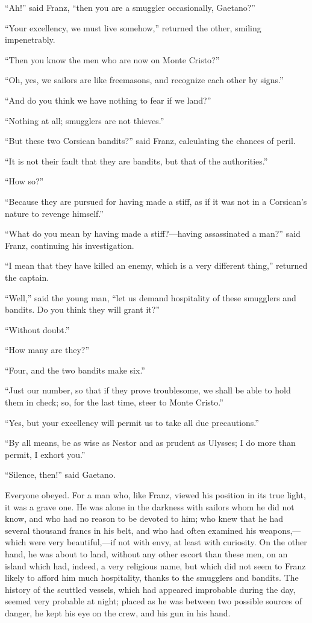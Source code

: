 “Ah!” said Franz, “then you are a smuggler occasionally, Gaetano?”

“Your excellency, we must live somehow,” returned the other, smiling
impenetrably.

“Then you know the men who are now on Monte Cristo?”

“Oh, yes, we sailors are like freemasons, and recognize each other by
signs.”

“And do you think we have nothing to fear if we land?”

“Nothing at all; smugglers are not thieves.”

“But these two Corsican bandits?” said Franz, calculating the chances
of peril.

“It is not their fault that they are bandits, but that of the
authorities.”

“How so?”

“Because they are pursued for having made a stiff, as if it was not in
a Corsican’s nature to revenge himself.”

“What do you mean by having made a stiff?—having assassinated a man?”
said Franz, continuing his investigation.

“I mean that they have killed an enemy, which is a very different
thing,” returned the captain.

“Well,” said the young man, “let us demand hospitality of these
smugglers and bandits. Do you think they will grant it?”

“Without doubt.”

“How many are they?”

“Four, and the two bandits make six.”

“Just our number, so that if they prove troublesome, we shall be able
to hold them in check; so, for the last time, steer to Monte Cristo.”

“Yes, but your excellency will permit us to take all due precautions.”

“By all means, be as wise as Nestor and as prudent as Ulysses; I do
more than permit, I exhort you.”

“Silence, then!” said Gaetano.

Everyone obeyed. For a man who, like Franz, viewed his position in its
true light, it was a grave one. He was alone in the darkness with
sailors whom he did not know, and who had no reason to be devoted to
him; who knew that he had several thousand francs in his belt, and who
had often examined his weapons,—which were very beautiful,—if not with
envy, at least with curiosity. On the other hand, he was about to land,
without any other escort than these men, on an island which had,
indeed, a very religious name, but which did not seem to Franz likely
to afford him much hospitality, thanks to the smugglers and bandits.
The history of the scuttled vessels, which had appeared improbable
during the day, seemed very probable at night; placed as he was between
two possible sources of danger, he kept his eye on the crew, and his
gun in his hand.

